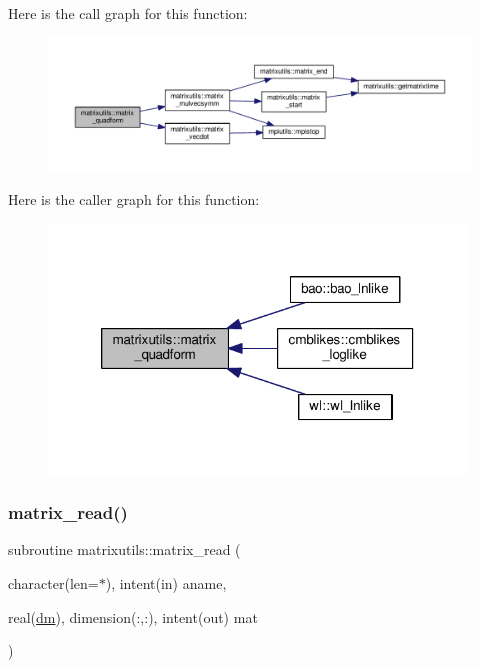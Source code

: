 Here is the call graph for this function\+:
\nopagebreak
\begin{figure}[H]
\begin{center}
\leavevmode
\includegraphics[width=350pt]{namespacematrixutils_affa7bde611de578a07d5a1bdf612f1b2_cgraph}
\end{center}
\end{figure}
Here is the caller graph for this function\+:
\nopagebreak
\begin{figure}[H]
\begin{center}
\leavevmode
\includegraphics[width=314pt]{namespacematrixutils_affa7bde611de578a07d5a1bdf612f1b2_icgraph}
\end{center}
\end{figure}
\mbox{\label{namespacematrixutils_ac778ea47bab010c70f3d6f00838e4668}} 
\subsubsection{\texorpdfstring{matrix\+\_\+read()}{matrix\_read()}}
{\footnotesize\ttfamily subroutine matrixutils\+::matrix\+\_\+read (\begin{DoxyParamCaption}\item[{character(len=$\ast$), intent(in)}]{aname,  }\item[{real(\mbox{\hyperlink{namespacematrixutils_a7bdc564986ea4d90f51201c75606ef3d}{dm}}), dimension(\+:,\+:), intent(out)}]{mat }\end{DoxyParamCaption})}



